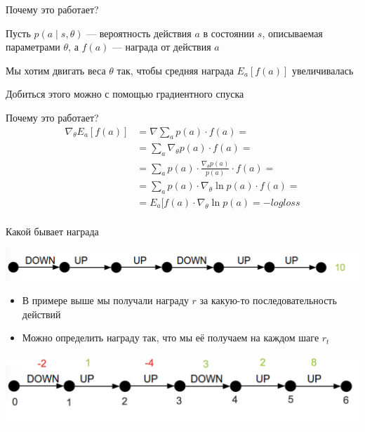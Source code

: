 \documentclass[notes,12pt, aspectratio=169]{beamer}
\newenvironment{wideitemize}{\itemize\addtolength{\itemsep}{10pt}}{\enditemize}
\begin{document}
\begin{frame}{Почему это работает?}
\begin{wideitemize}
	\item   Пусть $p(a \mid s, \theta)$ — вероятность действия $a$ в состоянии $s$, описываемая параметрами $\theta$, а $f(a)$ — награда от действия $a$
	\item Мы хотим двигать веса $\theta$ так, чтобы средняя награда $E_a [ f(a)]$ увеличивалась
	\item Добиться этого можно с помощью градиентного спуска
\end{wideitemize}
\end{frame}


\begin{frame}{Почему это работает?}
\begin{equation*}
\begin{aligned}
\nabla_{\theta} E_a [f(a)] & = \nabla \sum_a p(a) \cdot f(a) = \\
& = \sum_{a} \nabla_{\theta} p(a) \cdot f(a) = \\
& = \sum_{a} p(a) \cdot \frac{\nabla_{\theta} p(a)}{p(a)} \cdot f(a) = \\
& = \sum_{a} p(a) \cdot \nabla_{\theta} \ln p(a) \cdot f(a) = \\
& = E_a [ f(a) \cdot \nabla_{\theta} \ln p(a) = - logloss \\
\end{aligned}
\end{equation*}
\end{frame}


\begin{frame}{Какой бывает награда}
\begin{center}
	\includegraphics[width=.7\linewidth]{states.png}
\end{center}
\begin{itemize}
	\item В примере выше мы получали награду $r$ за какую-то последовательность действий
	\item Можно определить награду так, что мы её получаем на каждом шаге $r_t$
\end{itemize}
\begin{center}
	\includegraphics[width=.7\linewidth]{states_1.png}
\end{center}
\end{frame}
\end{document}
